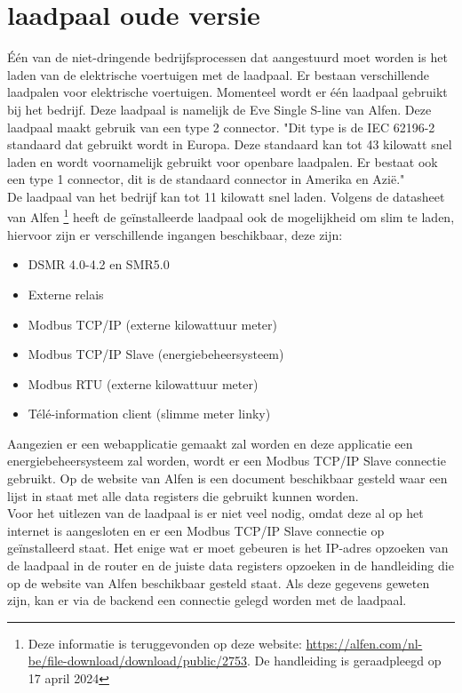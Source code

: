 \section{laadpaal oude versie}
\label{sec:stand-van-zaken-laadpaal-oud}

Één van de niet-dringende bedrijfsprocessen dat aangestuurd moet worden is het laden van de elektrische voertuigen met de laadpaal. Er bestaan verschillende laadpalen voor elektrische voertuigen. Momenteel wordt er één laadpaal gebruikt bij het bedrijf. Deze laadpaal is namelijk de Eve Single S-line van Alfen. Deze laadpaal maakt gebruik van een type 2 connector. "Dit type is de IEC 62196-2 standaard dat gebruikt wordt in Europa. Deze standaard kan tot 43 kilowatt snel laden en wordt voornamelijk gebruikt voor openbare laadpalen. Er bestaat ook een type 1 connector, dit is de standaard connector in Amerika en Azië." \autocite{HEMAVATHI2022105013} \\

De laadpaal van het bedrijf kan tot 11 kilowatt snel laden. Volgens de datasheet van Alfen \footnote{Deze informatie is teruggevonden op deze website: \url{https://alfen.com/nl-be/file-download/download/public/2753}. De handleiding is geraadpleegd op 17 april 2024} heeft de geïnstalleerde laadpaal ook de mogelijkheid om slim te laden, hiervoor zijn er verschillende ingangen beschikbaar, deze zijn:

\begin{itemize}
    \item DSMR 4.0-4.2 en SMR5.0
    \item Externe relais
    \item Modbus TCP/IP (externe kilowattuur meter)
    \item Modbus TCP/IP Slave (energiebeheersysteem)
    \item Modbus RTU (externe kilowattuur meter)
    \item Télé-information client (slimme meter linky)
\end{itemize}

Aangezien er een webapplicatie gemaakt zal worden en deze applicatie een energiebeheersysteem zal worden, wordt er een Modbus TCP/IP Slave connectie gebruikt. Op de website van Alfen is een document beschikbaar gesteld waar een lijst in staat met alle data registers die gebruikt kunnen worden.\\

Voor het uitlezen van de laadpaal is er niet veel nodig, omdat deze al op het internet is aangesloten en er een Modbus TCP/IP Slave connectie op geïnstalleerd staat. Het enige wat er moet gebeuren is het IP-adres opzoeken van de laadpaal in de router en de juiste data registers opzoeken in de handleiding die op de website van Alfen beschikbaar gesteld staat. Als deze gegevens geweten zijn, kan er via de backend een connectie gelegd worden met de laadpaal.\\

